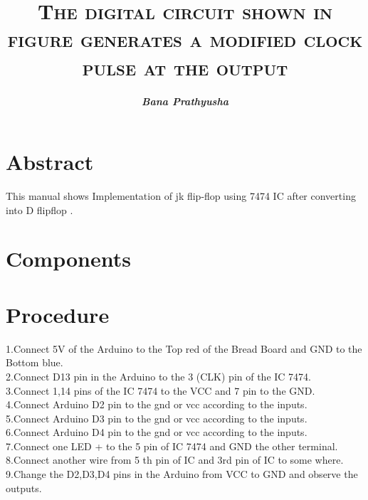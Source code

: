 \documentclass[jornal,10pt,twocolumn]{article}
\title{\textbf{\textsc{The digital circuit shown in figure generates a modified clock pulse at the output}}}
\author{\textit{\textbf{Bana Prathyusha}}}
\begin{document}
\maketitle
\section{Abstract}
This manual shows Implementation of jk flip-flop using 7474 IC after converting into D flipflop .
\section{Components}
\begin{table}[ht]
\caption{}
\label{Tabel-1}
\end{table}
\section{Procedure}
1.Connect 5V  of the Arduino to the Top red of the Bread Board  and GND to the Bottom blue.
\\
2.Connect D13 pin in the Arduino to the 3 (CLK) pin of the IC 7474.
\\
3.Connect 1,14  pins of the IC 7474 to the VCC and 7 pin to the GND.
\\
4.Connect  Arduino D2 pin to the gnd or vcc according to the inputs.
\\
5.Connect Arduino D3 pin to the gnd or vcc according to the inputs.
\\
6.Connect Arduino D4 pin to the gnd or vcc according to the inputs.
\\
7.Connect one LED + to the 5 pin of IC 7474 and GND the other terminal.
\\
8.Connect another wire from 5 th pin of IC and 3rd pin of IC to some where.\\
9.Change the D2,D3,D4 pins in the Arduino  from VCC to GND and observe the outputs.
\\
\end{document}
